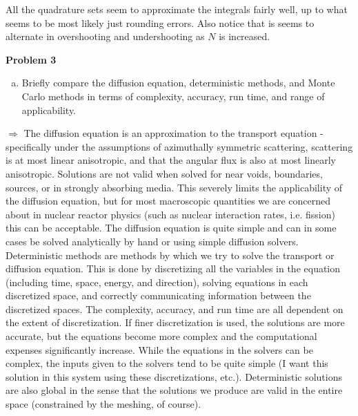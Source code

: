 \documentclass[10pt]{article}
\begin{document}
All the quadrature sets seem to approximate the integrals fairly well, up to what seems to be most likely just rounding errors. Also notice that is seems to alternate in overshooting and undershooting as $N$ is increased.






\newpage
\noindent \textbf{Problem 3}\\ [-4ex]
\begin{enumerate}[(a)]
    \item Briefly compare the diffusion equation, deterministic methods, and Monte Carlo methods in terms of complexity, accuracy, run time, and range of applicability. \\[-5pt]
\end{enumerate}

$\Rightarrow$ The diffusion equation is an approximation to the transport equation - specifically under the assumptions of azimuthally symmetric scattering, scattering is at most linear anisotropic, and that the angular flux is also at most linearly anisotropic. Solutions are not valid when solved for near voids, boundaries, sources, or in strongly absorbing media. This severely limits the applicability of the diffusion equation, but for most macroscopic quantities we are concerned about in nuclear reactor physics (such as nuclear interaction rates, i.e.\,\,fission) this can be acceptable. The diffusion equation is quite simple and can in some cases be solved analytically by hand or using simple diffusion solvers.\\

Deterministic methods are methods by which we try to solve the transport or diffusion equation. This is done by discretizing all the variables in the equation (including time, space, energy, and direction), solving equations in each discretized space, and correctly communicating information between the discretized spaces. The complexity, accuracy, and run time are all dependent on the extent of discretization. If finer discretization is used, the solutions are more accurate, but the equations become more complex and the computational expenses significantly increase. While the equations in the solvers can be complex, the inputs given to the solvers tend to be quite simple (I want this solution in this system using these discretizations, etc.). Deterministic solutions are also global in the sense that the solutions we produce are valid in the entire space (constrained by the meshing, of course). \\
\end{document}
